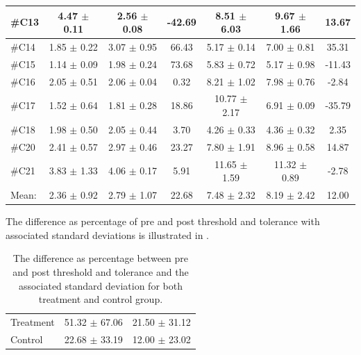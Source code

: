 \begin{longtable} {l|c|c|c|c|c|c}
\#C13 & 4.47 $\pm$ 0.11 & 2.56 $\pm$	0.08 & -42.69 & 8.51 $\pm$ 6.03 & 9.67 $\pm$  1.66 & 13.67 \\ \hline
\#C14 & 1.85 $\pm$ 0.22 & 3.07 $\pm$ 0.95 & 66.43	 & 5.17 $\pm$ 0.14  & 7.00 $\pm$ 0.81 & 35.31 \\ \hline
\#C15 & 1.14 $\pm$ 0.09 & 1.98 $\pm$ 0.24 & 73.68 & 5.83 $\pm$ 0.72 & 5.17 $\pm$ 0.98 & -11.43 \\ \hline
\#C16 & 2.05 $\pm$ 0.51 & 2.06 $\pm$ 0.04 & 0.32 & 8.21 $\pm$ 1.02 & 7.98 $\pm$ 0.76 & -2.84 \\ \hline
\#C17 & 1.52 $\pm$ 0.64 & 1.81 $\pm$ 0.28 & 18.86 & 10.77 $\pm$ 2.17 & 6.91 $\pm$ 0.09 & -35.79 \\ \hline
\#C18 & 1.98  $\pm$ 0.50 & 2.05 $\pm$ 0.44 & 3.70 & 4.26  $\pm$ 0.33 &  4.36 $\pm$  0.32 & 2.35 \\ \hline
\#C20 & 2.41 $\pm$  0.57 & 2.97 $\pm$ 0.46 & 23.27  & 7.80 $\pm$ 1.91  &  8.96 $\pm$ 0.58 & 14.87 \\ \hline
\#C21 & 3.83 $\pm$ 1.33 & 4.06 $\pm$  0.17 & 5.91 & 11.65 $\pm$ 1.59  & 11.32 $\pm$ 0.89 & -2.78 \\ \hline
Mean: & 2.36 $\pm$ 0.92 & 2.79 $\pm$ 1.07 & 22.68 & 7.48 $\pm$ 2.32 & 8.19 $\pm$ 2.42 & 12.00 \\ \hline 
\end{longtable}

The difference as percentage of pre and post threshold and tolerance with associated standard deviations is illustrated in .


\begin{longtable} {l|c|c}
	\caption{The difference as percentage between pre and post threshold and tolerance and the associated standard deviation for both treatment and control group.}
	\label{tab:Total} \\
\cellcolor[HTML]{C0C0C0}{} &
 \cellcolor[HTML]{C0C0C0}{\textbf{Threshold Difference [\%]}} &  \cellcolor[HTML]{C0C0C0}{\textbf{Tolerance Difference [\%]}} \\ \hline
Treatment & 51.32 $\pm$ 67.06 & 21.50 $\pm$ 31.12 \\ \hline
Control & 22.68 $\pm$ 33.19  & 12.00 $\pm$ 23.02 \\ \hline
\end{longtable}
\vspace{-.5cm} 

